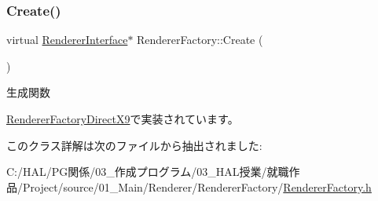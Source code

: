 \subsubsection{\texorpdfstring{Create()}{Create()}}
{\footnotesize\ttfamily virtual \mbox{\hyperlink{class_renderer_interface}{Renderer\+Interface}}$\ast$ Renderer\+Factory\+::\+Create (\begin{DoxyParamCaption}{ }\end{DoxyParamCaption})\hspace{0.3cm}{\ttfamily [pure virtual]}}



生成関数 



\mbox{\hyperlink{class_renderer_factory_direct_x9_aa64ac54f3efe121f531a28dd3b7690e3}{Renderer\+Factory\+Direct\+X9}}で実装されています。



このクラス詳解は次のファイルから抽出されました\+:\begin{DoxyCompactItemize}
\item 
C\+:/\+H\+A\+L/\+P\+G関係/03\+\_\+作成プログラム/03\+\_\+\+H\+A\+L授業/就職作品/\+Project/source/01\+\_\+\+Main/\+Renderer/\+Renderer\+Factory/\mbox{\hyperlink{_renderer_factory_8h}{Renderer\+Factory.\+h}}\end{DoxyCompactItemize}
